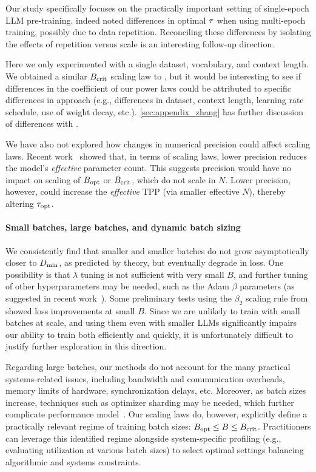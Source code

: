 Our study specifically focuses on the practically important setting of
single-epoch LLM pre-training.  \citet{wang2024how} indeed noted
differences in optimal $\tau$ when using multi-epoch training,
possibly due to data repetition. Reconciling these differences by
isolating the effects of repetition versus scale is an interesting
follow-up direction.

Here we only experimented with a single dataset, vocabulary, and
context length.  We obtained a similar $B_{\text{crit}}$ scaling law
to \citet{zhang2024how}, but it would be interesting to see if
differences in the coefficient of our power laws could be attributed
to specific differences in approach (e.g., differences in dataset,
context length, learning rate schedule, use of weight decay,
etc.).  \cref{sec:appendix_zhang} has further discussion of
differences with \citet{zhang2024how}.

We have also not explored how changes in numerical precision could
affect scaling laws.  Recent work~\citep{kumar2024scaling} showed
that, in terms of scaling laws, lower precision reduces the model's
\emph{effective} parameter count.  This suggests precision would
have no impact on scaling of $B_{\text{opt}}$ or $B_{\text{crit}}$, which do not scale
in $N$.  Lower precision, however, could increase the \emph{effective}
TPP (via smaller effective $N$), thereby altering ${\tau}_{\text{opt}}$.

\paragraph{Small batches, large batches, and dynamic batch sizing}

We consistently find that smaller and smaller batches do not grow
asymptotically closer to $D_{\text{min}}$, as predicted by theory, but
eventually degrade in loss.  One possibility is that $\lambda$ tuning
is not sufficient with very small $B$, and further tuning of other
hyperparameters may be needed, such as the Adam $\beta$ parameters (as
suggested in recent
work~\citep{porian2024resolving,zhang2024how,marek2025small}).
%
Some preliminary tests using the $\beta_2$ scaling rule
from \citet{marek2025small} showed loss improvements at small $B$.
%
Since we are unlikely to train with small batches at scale, and using
them even with smaller LLMs significantly impairs our ability to train
both efficiently and quickly, it is unfortunately difficult to justify
further exploration in this direction.

Regarding large batches, our methods do not account for the many
practical systems-related issues, including bandwidth and
communication overheads, memory limits of hardware, synchronization
delays, etc.  
%
Moreover, as batch sizes increase, techniques such as optimizer
sharding may be needed, which further complicate performance
model~\citep{almazrouei2023falcon}.
%
Our scaling laws do, however, explicitly define a practically relevant
regime of training batch sizes: $B_{\text{opt}} \le
B \le B_{\text{crit}}$. Practitioners can leverage this identified regime
alongside system-specific profiling (e.g., evaluating utilization at
various batch sizes) to select optimal settings balancing algorithmic
and systems constraints.

